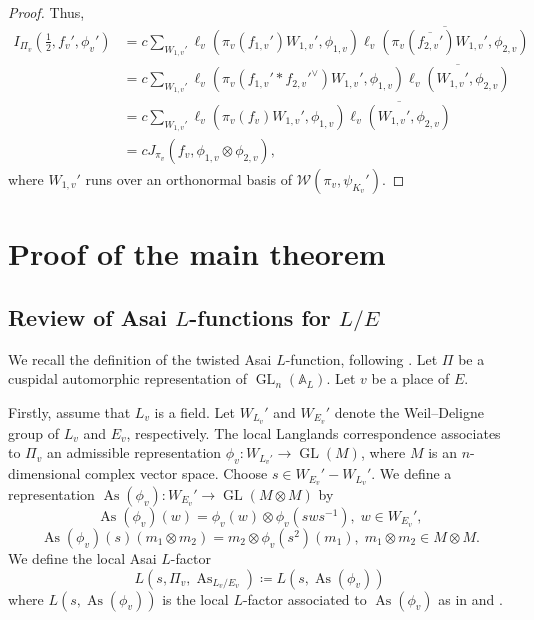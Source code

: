 \documentclass[11pt, reqno]{amsart}
\numberwithin{equation}{subsection}
\theoremstyle{plain}
\theoremstyle{definition}
\renewcommand{\AA}{\mathbb A}
\newcommand{\ol}{\overline}
\newcommand{\W}{\mathcal W}
\DeclareMathOperator{\As}{As}
\DeclareMathOperator{\GL}{GL}
\begin{document}
\begin{proof}
Thus,
\begin{align*}
    I_{\Pi_v}(\tfrac12, f_v', \phi_v')
    &=
    c\sum_{W_{1,v}'} \ell_v(\pi_v(f_{1,v}')
    W_{1,v}', \phi_{1,v})
    \ol{\ell_v(\pi_v(\ol{f_{2,v}'})W_{1,v}', \phi_{2,v})} \\
    &= c\sum_{W_{1,v}'} \ell_v(\pi_v(f_{1,v}'
    \ast f_{2,v}'^\vee)
    W_{1,v}', \phi_{1,v})
    \ol{\ell_v(W_{1,v}', \phi_{2,v})}\\
    &= c\sum_{W_{1,v}'} \ell_v(\pi_v(f_{v})
    W_{1,v}', \phi_{1,v})
    \ol{\ell_v(W_{1,v}', \phi_{2,v})}\\
    &= cJ_{\pi_v}(f_v, \phi_{1,v} \otimes \phi_{2,v}),
\end{align*}
where $W_{1,v}'$ runs over an orthonormal basis of
$\W(\pi_v, \psi_{K_v}')$.
\end{proof}




\section{Proof of the main theorem}
\label{section: proof of the main theorem}

\subsection{Review of Asai $L$-functions for $L/E$}

We recall the definition of the twisted Asai 
$L$-function, following \cite[Section~3.2]{BP21}.
Let $\Pi$ be a cuspidal automorphic representation
of $\GL_n(\AA_L)$. Let $v$ be a place of $E$.

Firstly, assume that $L_v$ is a field. Let $W_{L_v}'$ and $W_{E_v}'$ denote
the Weil--Deligne group of $L_v$ and $E_v$, 
respectively.
The local Langlands correspondence associates to $\Pi_v$ 
an admissible representation $\phi_v \colon W_{L_v'} \to \GL(M)$, 
where $M$ is an $n$-dimensional complex vector space.
Choose $s \in W_{E_v}' - W_{L_v}'$.
We define a representation $\As(\phi_v) \colon
W_{E_v}' \to \GL(M \otimes M)$ by
\[
    \As(\phi_v)(w) = \phi_v(w) \otimes \phi_v(sws^{-1}), \; w \in W_{E_v}', 
\]
\[
    \As(\phi_v)(s)(m_1 \otimes m_2) = m_2 \otimes
    \phi_v(s^2)(m_1), \; m_1 \otimes m_2 \in M \otimes M.
\]
We define the local Asai $L$-factor 
\[
    L(s, \Pi_v, \As_{L_v/E_v}) \coloneqq
    L(s, \As(\phi_v))
\]
where $L(s, \As(\phi_v))$ is the local $L$-factor
associated to $\As(\phi_v)$ as in
\cite[Section~3]{MR546607} and \cite[Section~2.2]{MR2730575}.
\end{document}

